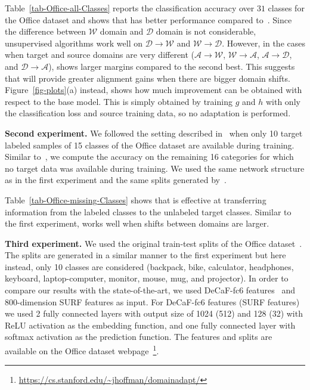 Table~\ref{tab-Office-all-Classes} reports the classification accuracy over $31$ classes for the Office dataset and shows that \modelDA has better performance compared to~\cite{tzengHDS15iccv}. Since the difference between $\mathcal{W}$ domain and $\mathcal{D}$ domain is not considerable, unsupervised algorithms work well on $\mathcal{D} \rightarrow \mathcal{W}$ and $\mathcal{W} \rightarrow \mathcal{D}$.   However, in the cases when target and source domains are very different ($\mathcal{A} \rightarrow \mathcal{W}$, $\mathcal{W} \rightarrow \mathcal{A}$, $\mathcal{A} \rightarrow \mathcal{D}$, and $\mathcal{D} \rightarrow \mathcal{A}$), \modelDA shows larger margins compared to the second best. This suggests that \modelDA will provide greater alignment gains when there are bigger domain shifts. Figure~\ref{fig-plots}(a) instead, shows how much improvement can be obtained with respect to the base model. This is simply obtained by training $g$ and $h$ with only the classification loss and source training data, so no adaptation is performed.


\noindent \textbf{Second experiment.}  We followed the setting described in~\cite{tzengHDS15iccv} when only 10 target labeled samples of 15 classes of the Office dataset are available during training. Similar to~\cite{tzengHDS15iccv}, we compute the accuracy on the remaining 16 categories for which no target data was available during training. We used the same network structure as in the first experiment and the same splits generated by~\cite{tzengHDS15iccv}.

Table~\ref{tab-Office-missing-Classes} shows that \modelDA is effective at transferring information from the labeled classes to the unlabeled target classes. Similar to the first experiment, \modelDA works well when shifts between domains are larger.

\noindent \textbf{Third experiment.} We used the original train-test splits of the Office dataset~\cite{saenkoKFD2010eccv}. The splits are generated in a similar manner to the first experiment but here instead, only 10 classes are considered (backpack, bike, calculator, headphones, keyboard, laptop-computer, monitor, mouse, mug, and projector). In order to compare our results with the state-of-the-art, we used DeCaF-fc6 features~\cite{Donahue13decaf} and 800-dimension SURF features as input.  For DeCaF-fc6 features (SURF features) we used 2 fully connected layers with output size of 1024 (512) and 128 (32) with ReLU activation as the embedding function, and one fully connected layer with softmax activation as the prediction function.
The features and splits are available on the Office dataset webpage~\footnote{\url{https://cs.stanford.edu/~jhoffman/domainadapt/}}.

